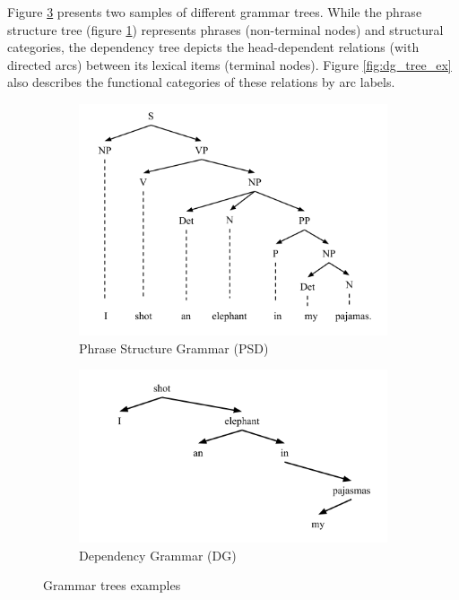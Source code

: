 \documentclass[12pt]{article}
\begin{document}
Figure \ref{fig:grm_tree_ex} presents two samples of different grammar trees. While the phrase structure tree (figure \ref{fig:psg_tree}) represents phrases (non-terminal nodes) and structural categories, the dependency tree depicts the head-dependent relations (with directed arcs) between its lexical items (terminal nodes). Figure \ref{fig:dg_tree_ex} also describes the functional categories of these relations by arc labels.

\begin{figure}[h]
	\centering
	\begin{subfigure}[b]{.49\linewidth}
	    	\includegraphics[width=\linewidth]{PSG_tree}
	    	\caption{Phrase Structure Grammar (PSD)}\label{fig:psg_tree}
	\end{subfigure}
	\begin{subfigure}[b]{.49\linewidth}
		\includegraphics[width=\linewidth]{DG_tree}
		\caption{Dependency Grammar (DG)}\label{fig:dg_tree}
	\end{subfigure}
	\caption{Grammar trees examples}
	\label{fig:grm_tree_ex}
\end{figure}
\end{document}
